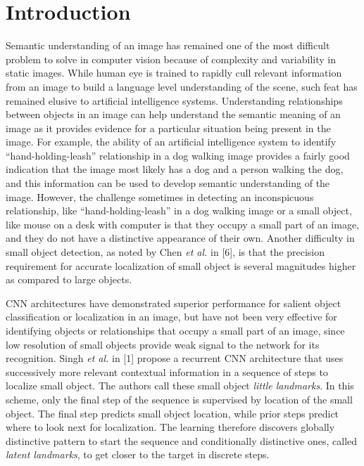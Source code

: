 \documentclass [11pt,letterpaper ,twoside ,openany ]{report}
\begin{document}
    \chapter{Introduction}
    \doublespacing
    Semantic understanding of an image has remained one of the most difficult problem to solve in computer vision because of complexity and variability in static images. While human eye is trained to rapidly cull relevant information from an image to build a language level understanding of the scene, such feat has remained elusive to artificial intelligence systems. Understanding relationships between objects in an image can help understand the semantic meaning of an image as it provides evidence for a particular situation being present in the image. For example, the ability of an artificial intelligence system to identify ``hand-holding-leash'' relationship in a dog walking image provides a fairly good indication that the image most likely has a dog and a person walking the dog, and this information can be used to develop semantic understanding of the image. However, the challenge sometimes in detecting an inconspicuous relationship, like ``hand-holding-leash'' in a dog walking image or a small object, like mouse on a desk with computer is that they occupy a small part of an image, and they do not have a distinctive appearance of their own. Another difficulty in small object detection, as noted by Chen \textit{et al.} in [6], is that the precision requirement for accurate localization of small object is several magnitudes higher as compared to large objects. 
    
    CNN architectures have demonstrated superior performance for salient object classification or localization in an image, but have not been very effective for identifying objects or relationships that occupy a small part of an image, since low resolution of small objects provide weak signal to the network for its recognition. Singh \textit{et al.} in [1] propose a recurrent CNN architecture that uses successively more relevant contextual information in a sequence of steps to localize small object. The authors call these small object \textit {little landmarks}. In this scheme, only the final step of the sequence is supervised by location of the small object. The final step predicts small object location, while prior steps predict where to look next for localization. The learning therefore discovers globally distinctive pattern to start the sequence and conditionally distinctive ones, called \textit {latent landmarks}, to get closer to the target in discrete steps.
\end{document}
